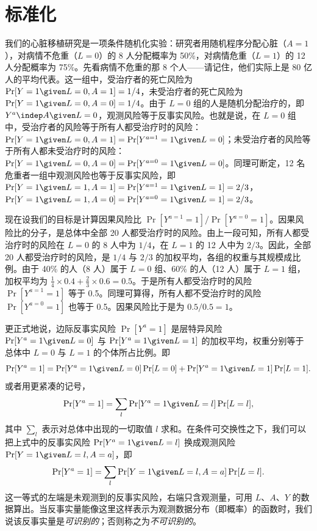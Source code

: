 \section{标准化}

我们的心脏移植研究是一项条件随机化实验：研究者用随机程序分配心脏（$A=1$），对病情不危重（$L=0$）的 8 人分配概率为 50\%，对病情危重（$L=1$）的 12 人分配概率为 75\%。先看病情不危重的那 8 个人——请记住，他们实际上是 80 亿人的平均代表。这一组中，受治疗者的死亡风险为 $\Pr[Y=1\given L=0,A=1]=1/4$，未受治疗者的死亡风险为 $\Pr[Y=1\given L=0,A=0]=1/4$。由于 $L=0$ 组的人是随机分配治疗的，即 $Y^{a}\indep A\given L=0$，观测风险等于反事实风险。也就是说，在 $L=0$ 组中，受治疗者的风险等于所有人都受治疗时的风险：$\Pr[Y=1\given L=0,A=1]=\Pr[Y^{a=1}=1\given L=0]$；未受治疗者的风险等于所有人都未受治疗时的风险：$\Pr[Y=1\given L=0,A=0]=\Pr[Y^{a=0}=1\given L=0]$。同理可断定，12 名危重者一组中观测风险也等于反事实风险，即 $\Pr[Y=1\given L=1,A=1]=\Pr[Y^{a=1}=1\given L=1]=2/3$，$\Pr[Y=1\given L=1,A=0]=\Pr[Y^{a=0}=1\given L=1]=2/3$。

现在设我们的目标是计算因果风险比 $\Pr[Y^{a=1}=1]/\Pr[Y^{a=0}=1]$。因果风险比的分子，是总体中全部 20 人都受治疗时的风险。由上一段可知，所有人都受治疗时的风险在 $L=0$ 的 8 人中为 $1/4$，在 $L=1$ 的 12 人中为 $2/3$。因此，全部 20 人都受治疗时的风险，是 $1/4$ 与 $2/3$ 的加权平均，各组的权重与其规模成比例。由于 40\% 的人（8 人）属于 $L=0$ 组、60\% 的人（12 人）属于 $L=1$ 组，加权平均为 $\frac{1}{4}\times 0.4+\frac{2}{3}\times 0.6=0.5$。于是所有人都受治疗时的风险 $\Pr[Y^{a=1}=1]$ 等于 0.5。同理可算得，所有人都不受治疗时的风险 $\Pr[Y^{a=0}=1]$ 也等于 0.5。因果风险比于是为 $0.5/0.5=1$。

更正式地说，边际反事实风险 $\Pr[Y^{a}=1]$ 是层特异风险 $\Pr[Y^{a}=1\given L=0]$ 与 $\Pr[Y^{a}=1\given L=1]$ 的加权平均，权重分别等于总体中 $L=0$ 与 $L=1$ 的个体所占比例。即
\[
\Pr[Y^{a}=1]=\Pr[Y^{a}=1\given L=0]\Pr[L=0]+\Pr[Y^{a}=1\given L=1]\Pr[L=1].
\]
或者用更紧凑的记号，
\[
\Pr[Y^{a}=1]=\sum_{l}\Pr[Y^{a}=1\given L=l]\Pr[L=l],
\]
其中 $\sum_l$ 表示对总体中出现的一切取值 $l$ 求和。在条件可交换性之下，我们可以把上式中的反事实风险 $\Pr[Y^{a}=1\given L=l]$ 换成观测风险 $\Pr[Y=1\given L=l,A=a]$，即
\[
\Pr[Y^{a}=1]=\sum_{l}\Pr[Y=1\given L=l,A=a]\Pr[L=l].
\]
这一等式的左端是未观测到的反事实风险，右端只含观测量，可用 $L$、$A$、$Y$ 的数据算出。当反事实量能像这里这样表示为观测数据分布（即概率）的函数时，我们说该反事实量是\emph{可识别的}；否则称之为\emph{不可识别的}。



